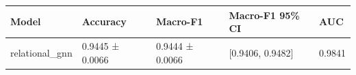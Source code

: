 \begin{tabular}{lllll}
\toprule
Model & Accuracy & Macro-F1 & Macro-F1 95\% CI & AUC \\
\midrule
relational\_gnn & 0.9445 ± 0.0066 & 0.9444 ± 0.0066 & [0.9406, 0.9482] & 0.9841 \\
\bottomrule
\end{tabular}
